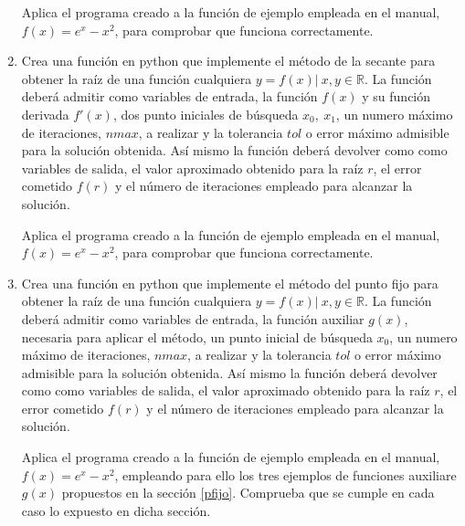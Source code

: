 \begin{paracol}{2}
\begin{enumerate}
Aplica el programa creado a la función de ejemplo empleada en el manual, $f(x) = e^x-x^2$, para comprobar que funciona correctamente.

\item Crea una función en python que implemente el método de la secante para obtener la raíz de una función cualquiera $y = f(x)\vert\  x, y \in \mathbb{R}$. La función deberá admitir como variables de entrada, la función $f(x)$ y su función derivada $f'(x)$, dos punto iniciales de búsqueda $x_0,\ x_1$, un numero máximo de iteraciones, $nmax$, a realizar y la tolerancia $tol$ o error máximo admisible para la solución obtenida. Así mismo la función deberá devolver como como variables de salida, el valor aproximado obtenido para la raíz $r$, el error cometido $f(r)$ y el número de iteraciones empleado para alcanzar la solución.

Aplica el programa creado a la función de ejemplo empleada en el manual, $f(x) = e^x-x^2$, para comprobar que funciona correctamente.

\item Crea una función en python que implemente el método del punto fijo para obtener la raíz de una función cualquiera $y = f(x)\vert\  x, y \in \mathbb{R}$. La función deberá admitir como variables de entrada, la función auxiliar $g(x)$, necesaria para aplicar el método, un punto inicial de búsqueda $x_0$, un numero máximo de iteraciones, $nmax$, a realizar y la tolerancia $tol$ o error máximo admisible para la solución obtenida. Así mismo la función deberá devolver como como variables de salida, el valor aproximado obtenido para la raíz $r$, el error cometido $f(r)$ y el número de iteraciones empleado para alcanzar la solución.

Aplica el programa creado a la función de ejemplo empleada en el manual, $f(x) = e^x-x^2$, empleando para ello los tres ejemplos de funciones auxiliare $g(x)$ propuestos en la sección \ref{pfijo}. Comprueba que se cumple en cada caso lo expuesto en dicha sección.


\end{enumerate}
\end{paracol}
